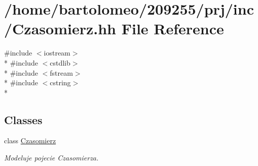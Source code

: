 \hypertarget{_czasomierz_8hh}{\section{/home/bartolomeo/209255/prj/inc/\-Czasomierz.hh File Reference}
\label{_czasomierz_8hh}
}
{\ttfamily \#include $<$iostream$>$}\\*
{\ttfamily \#include $<$cstdlib$>$}\\*
{\ttfamily \#include $<$fstream$>$}\\*
{\ttfamily \#include $<$cstring$>$}\\*
\subsection*{Classes}
\begin{DoxyCompactItemize}
\item 
class \hyperlink{class_czasomierz}{Czasomierz}
\begin{DoxyCompactList}\small\item\em Modeluje pojecie Czasomierza. \end{DoxyCompactList}\end{DoxyCompactItemize}
